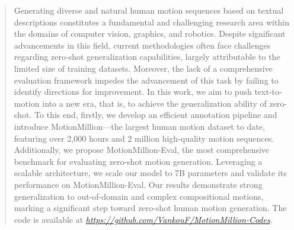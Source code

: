 \begin{abstract}
Generating diverse and natural human motion sequences based on textual descriptions constitutes a fundamental and challenging research area within the domains of computer vision, graphics, and robotics. Despite significant advancements in this field, current methodologies often face challenges regarding zero-shot generalization capabilities, largely attributable to the limited size of training datasets. Moreover, the lack of a comprehensive evaluation framework impedes the advancement of this task by failing to identify directions for improvement. In this work, we aim to push text-to-motion into a new era, that is, to achieve the generalization ability of zero-shot. To this end, firstly, we develop an efficient annotation pipeline and introduce MotionMillion—the largest human motion dataset to date, featuring over 2,000 hours and 2 million high-quality motion sequences. Additionally, we propose MotionMillion-Eval, the most comprehensive benchmark for evaluating zero-shot motion generation. Leveraging a scalable architecture, we scale our model to 7B parameters and validate its performance on MotionMillion-Eval. Our results demonstrate strong generalization to out-of-domain and complex compositional motions, marking a significant step toward zero-shot human motion generation. The code is available at \it{\url{https://github.com/VankouF/MotionMillion-Codes}}.
\end{abstract}